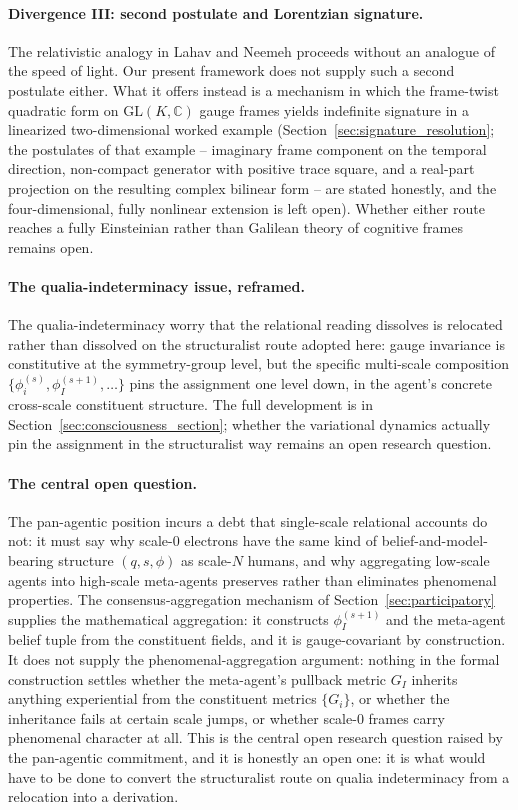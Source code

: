 \documentclass[11pt]{article}
\begin{document}
\paragraph{Divergence III: second postulate and Lorentzian signature.}
The relativistic analogy in Lahav and Neemeh proceeds without an analogue of the speed of light. Our present framework does not supply such a second postulate either. What it offers instead is a mechanism in which the frame-twist quadratic form on $\mathrm{GL}(K, \mathbb{C})$ gauge frames yields indefinite signature in a linearized two-dimensional worked example (Section~\ref{sec:signature_resolution}; the postulates of that example -- imaginary frame component on the temporal direction, non-compact generator with positive trace square, and a real-part projection on the resulting complex bilinear form -- are stated honestly, and the four-dimensional, fully nonlinear extension is left open). Whether either route reaches a fully Einsteinian rather than Galilean theory of cognitive frames remains open.

\paragraph{The qualia-indeterminacy issue, reframed.}
The qualia-indeterminacy worry that the relational reading dissolves is relocated rather than dissolved on the structuralist route adopted here: gauge invariance is constitutive at the symmetry-group level, but the specific multi-scale composition $\{\phi_i^{(s)}, \phi_I^{(s+1)}, \ldots\}$ pins the assignment one level down, in the agent's concrete cross-scale constituent structure. The full development is in Section~\ref{sec:consciousness_section}; whether the variational dynamics actually pin the assignment in the structuralist way remains an open research question.

\paragraph{The central open question.}
The pan-agentic position incurs a debt that single-scale relational accounts do not: it must say why scale-0 electrons have the same kind of belief-and-model-bearing structure $(q, s, \phi)$ as scale-$N$ humans, and why aggregating low-scale agents into high-scale meta-agents preserves rather than eliminates phenomenal properties. The consensus-aggregation mechanism of Section~\ref{sec:participatory} supplies the mathematical aggregation: it constructs $\phi_I^{(s+1)}$ and the meta-agent belief tuple from the constituent fields, and it is gauge-covariant by construction. It does not supply the phenomenal-aggregation argument: nothing in the formal construction settles whether the meta-agent's pullback metric $G_I$ inherits anything experiential from the constituent metrics $\{G_i\}$, or whether the inheritance fails at certain scale jumps, or whether scale-0 frames carry phenomenal character at all. This is the central open research question raised by the pan-agentic commitment, and it is honestly an open one: it is what would have to be done to convert the structuralist route on qualia indeterminacy from a relocation into a derivation.
\end{document}
